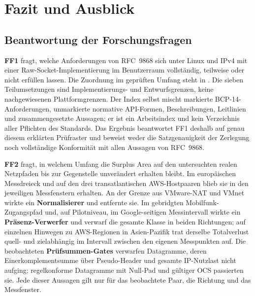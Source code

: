 
\chapter{Fazit und Ausblick}
\label{chap:fazit}

\section{Beantwortung der Forschungsfragen}
\label{sec:ff-beantwortung}

\textbf{FF1} fragt, welche Anforderungen von RFC~9868 sich unter Linux und IPv4 mit einer
Raw-Socket-Implementierung im Benutzerraum vollständig, teilweise oder nicht erfüllen lassen. Die
Zuordnung im geprüften Umfang steht in
. Die sieben Teilumsetzungen sind Implementierungs- und Entwurfsgrenzen, keine
nachgewiesenen Plattformgrenzen. Der Index selbst mischt markierte BCP-14-Anforderungen, unmarkierte
normative API-Formen, Beschreibungen, Leitlinien und zusammengesetzte Aussagen; er ist ein Arbeitsindex
und kein Verzeichnis aller Pflichten des Standards. Das Ergebnis beantwortet FF1 deshalb auf genau diesem
erklärten Prüfraster und beweist weder die Satzgenauigkeit der Zerlegung noch vollständige Konformität
mit allen Aussagen von RFC~9868.

\textbf{FF2} fragt, in welchem Umfang die Surplus Area auf den untersuchten realen Netzpfaden bis zur
Gegenstelle unverändert erhalten bleibt. Im europäischen Messdreieck und auf den drei transatlantischen
AWS-Hostpaaren blieb sie in den jeweiligen Messfenstern erhalten. An der Grenze aus VMware-NAT und VMnet
wirkte ein \textbf{Normalisierer} und entfernte sie. Im gebridgten Mobilfunk-Zugangspfad und, auf
Pilotniveau, im Google-seitigen Messintervall
wirkte ein \textbf{Präsenz-Verwerfer} und verwarf die gesamte Klasse in beiden Richtungen; auf einzelnen
Hinwegen zu AWS-Regionen in Asien-Pazifik trat derselbe Totalverlust quell- und zielabhängig im Intervall zwischen
den eigenen Messpunkten auf. Die beobachteten \textbf{Prüfsummen-Gates} verwarfen Datagramme, deren
Einerkomplementsumme über Pseudo-Header und gesamte IP-Nutzlast nicht aufging;
regelkonforme Datagramme mit Null-Pad und gültiger OCS passierten sie. Jede dieser Aussagen gilt nur für
das beobachtete Paar, die Richtung und das Messfenster.

